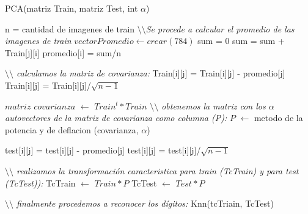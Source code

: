 \begin{algorithm}[H]
\caption{PCA(matriz Train, matriz Test, int $\alpha$)}
\begin{algorithmic}[1]
\State n = cantidad de imagenes de train
\State \textit{$\setminus\setminus$Se procede a calcular el promedio de las imagenes de train}
\State $ vector Promedio \gets crear(784)$
	\State sum = 0	
		\State sum = sum + Train[j][i]
	\EndFor
	\State promedio[i] = sum/n
\EndFor

\State \textit{$\setminus\setminus$ calculamos la matriz de covarianza:}
		\State Train[i][j] = Train[i][j] - promedio[j]
	\EndFor
	\State Train[i][j] = Train[i][j]/$\sqrt{n-1}$
\EndFor	

\State $matriz$ $covarianza$ $\gets$ $Train^{t}*Train$	
\State \textit{$\setminus\setminus$ obtenemos la matriz con los $\alpha$ autovectores de la matriz de covarianza como columna (P):}
\State $P$ $\gets$ metodo de la potencia y de deflacion (covarianza, $\alpha$)

		\State test[i][j] = test[i][j] - promedio[j]
	\EndFor
	\State test[i][j] = test[i][j]/$\sqrt{n-1}$
\EndFor	

\State \textit{$\setminus\setminus$ realizamos la transformaci\'on caracteristica para train (TcTrain) y para test (TcTest)):}
\State  TcTrain $\gets$ $Train*P$
\State  TcTest $\gets$ $Test*P$


\State \textit{$\setminus\setminus$ finalmente procedemos a reconocer los d\'igitos:}
\State Knn(tcTriain, TcTest)
\end{algorithmic}
\end{algorithm}